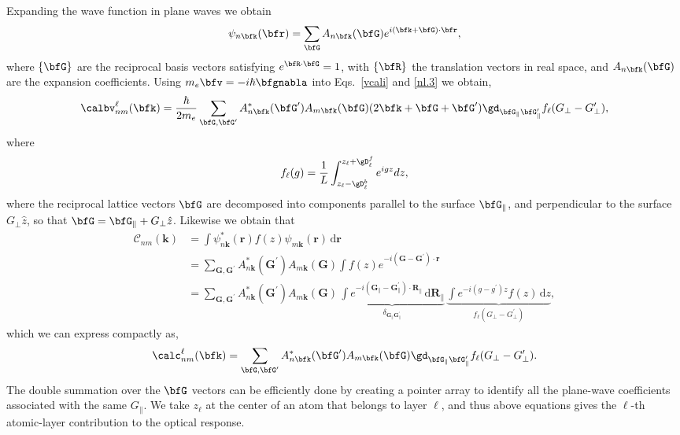 Expanding the wave function in plane waves we obtain
\begin{align}\label{eni.1}
\psi_{n\bfk}(\bfr)=\sum_\bfG A_{n\bfk}(\bfG)e^{i(\bfk+\bfG)\cdot\bfr}
,
\end{align}
where $\{\bfG\}$ are the reciprocal basis vectors satisfying
$e^{\bfR\cdot\bfG}=1$, with $\{\bfR\}$ the translation vectors in real
space, and $A_{n\bfk}(\bfG)$ are the expansion coefficients. Using
$m_e\bfv=-i\hbar\bfgnabla$ into Eqs.~\eqref{vcali}
and \eqref{nl.3}
 we obtain,\cite{mendozaPRB06}
\begin{align}\label{eni.2}
\calbv^\ell_{nm}(\bfk)=
\frac{\hbar}{2m_e}
\sum_{\bfG,\bfG'} A^*_{n\bfk}(\bfG')  A_{m\bfk}(\bfG)
(2\bfk+\bfG+\bfG')
\gd_{\bfG_\parallel \bfG'_\parallel}  
f_\ell(G_\perp-G'_\perp)
,
\end{align}   
where
\begin{align}\label{eni.3}
f_\ell(g)=\frac{1}{L}\int_{z_\ell-\gD^b_\ell}^{z_\ell+\gD^f_\ell} e^{igz}dz
,
\end{align}
where the reciprocal lattice vectors $\bfG$ are decomposed into components
parallel to the surface $\bfG_\parallel$, and perpendicular to the
surface $G_\perp \hat z$, so
that $\bfG = \bfG_\parallel + G_\perp\hat z$.
Likewise we obtain that
\begin{align*}
\mathcal{C}_{nm}(\mathbf{k})
&=  \int\psi^{*}_{n\mathbf{k}}(\mathbf{r})f(z)
    \psi_{m\mathbf{k}}(\mathbf{r})\,\text{d}\mathbf{r}\\
&=  \sum_{\mathbf{G},\mathbf{G^{\prime}}}
    A^{*}_{n\mathbf{k}}(\mathbf{G^{\prime}})
    A_{m\mathbf{k}}(\mathbf{G})
    \int f(z)e^{-i(\mathbf{G}-\mathbf{G^{\prime}})\cdot\mathbf{r}}\\
&=  \sum_{\mathbf{G},\mathbf{G^{\prime}}}
    A^{*}_{n\mathbf{k}}(\mathbf{G^{\prime}})
    A_{m\mathbf{k}}(\mathbf{G})
    \,\underbrace{
    \int e^{-i(\mathbf{G}_{\parallel}-\mathbf{G}^{\prime}_{\parallel})
    \cdot\mathbf{R}_{\parallel}}\,\text{d}\mathbf{R}_{\parallel}
    }_{\delta_{\mathbf{G}_{\parallel}\mathbf{G}^{\prime}_{\parallel}}}
    \,\underbrace{
    \int e^{-i(g-g^{\prime})z}f(z)\,\text{d}z
    }_{f_{\ell}(G_{\perp} - G^{\prime}_{\perp})},
\end{align*}
which we can express compactly as,
\begin{align}\label{eni.4}
\calc^\ell_{nm}(\bfk)=
\sum_{\bfG,\bfG'} A^*_{n\bfk}(\bfG')  A_{m\bfk}(\bfG)
\gd_{\bfG_\parallel \bfG'_\parallel} 
f_\ell(G_\perp-G'_\perp)
.
\end{align}  
The double summation over the $\bfG$ vectors can be efficiently done by
creating a pointer array to identify all the plane-wave coefficients
associated with the same $G_\parallel$. We take $z_\ell$
 at the center of an atom that
belongs to layer $\ell$, and thus above equations gives the $\ell$-th
 atomic-layer
contribution to the optical response.\cite{mendozaPRB06} 

